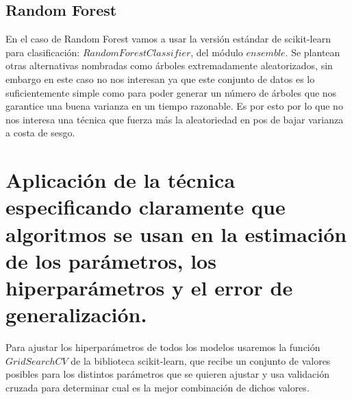 \documentclass{article}
\begin{document}
	\subsection{Random Forest}
	En el caso de Random Forest vamos a usar la versión estándar de scikit-learn para clasificación: $RandomForestClassifier$, del módulo $ensemble$. Se plantean otras alternativas nombradas como árboles extremadamente aleatorizados, sin embargo en este caso no nos interesan ya que este conjunto de datos es lo suficientemente simple como para poder generar un número de árboles que nos garantice una buena varianza en un tiempo razonable. Es por esto por lo que no nos interesa una técnica que fuerza más la aleatoriedad en pos de bajar varianza a costa de sesgo.
	
	\section{Aplicación de la técnica especificando claramente que algoritmos se usan en la estimación de los parámetros, los hiperparámetros y el error de generalización.}
	
	Para ajustar los hiperparámetros de todos los modelos usaremos la función $GridSearchCV$ de la biblioteca scikit-learn, que recibe un conjunto de valores posibles para los distintos parámetros que se quieren ajustar y usa validación cruzada para determinar cual es la mejor combinación de dichos valores.
\end{document}

